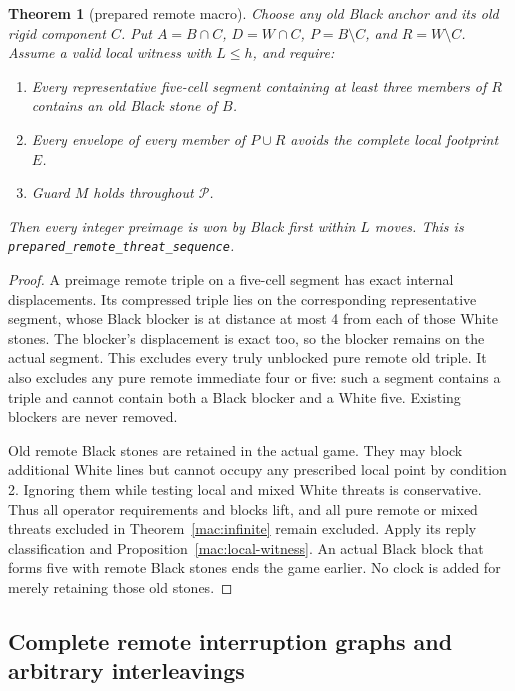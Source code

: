 \documentclass[11pt]{article}
\newtheorem{theorem}{Theorem}[section]
\theoremstyle{definition}
\theoremstyle{remark}
\begin{document}
\begin{theorem}[prepared remote macro]\label{mac:prepared}
Choose any old Black anchor and its old rigid component \(C\). Put \(A=B\cap C\), \(D=W\cap C\), \(P=B\setminus C\), and \(R=W\setminus C\). Assume a valid local witness with \(L\le h\), and require:

\begin{enumerate}
\item Every representative five-cell segment containing at least three members of \(R\) contains an old Black stone of \(B\).
\item Every envelope of every member of \(P\cup R\) avoids the complete local footprint \(E\).
\item Guard \(M\) holds throughout \(\mathcal P\).

\end{enumerate}
Then every integer preimage is won by Black first within \(L\) moves. This is \texttt{prepared\_\allowbreak remote\_\allowbreak threat\_\allowbreak sequence}.

\end{theorem}
\begin{proof}
A preimage remote triple on a five-cell segment has exact internal displacements. Its compressed triple lies on the corresponding representative segment, whose Black blocker is at distance at most 4 from each of those White stones. The blocker's displacement is exact too, so the blocker remains on the actual segment. This excludes every truly unblocked pure remote old triple. It also excludes any pure remote immediate four or five: such a segment contains a triple and cannot contain both a Black blocker and a White five. Existing blockers are never removed.

Old remote Black stones are retained in the actual game. They may block additional White lines but cannot occupy any prescribed local point by condition 2. Ignoring them while testing local and mixed White threats is conservative. Thus all operator requirements and blocks lift, and all pure remote or mixed threats excluded in Theorem~\ref{mac:infinite} remain excluded. Apply its reply classification and Proposition~\ref{mac:local-witness}. An actual Black block that forms five with remote Black stones ends the game earlier. No clock is added for merely retaining those old stones. 
\end{proof}



\subsection{Complete remote interruption graphs and arbitrary interleavings}\label{mac:interruption-section}
\end{document}
